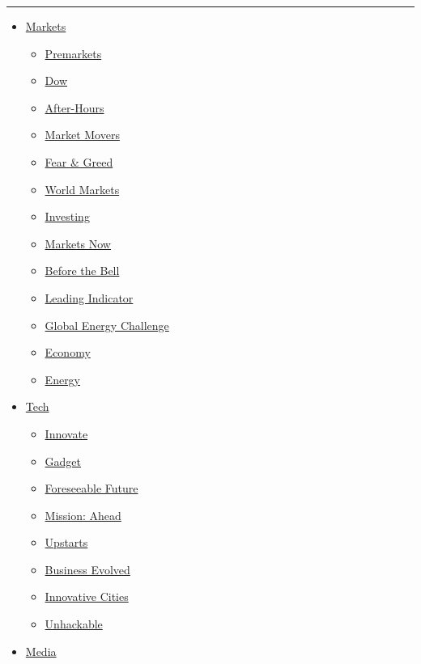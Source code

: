 \begin{center}\rule{0.5\linewidth}{\linethickness}\end{center}

\begin{itemize}
\tightlist
\item
  \href{https://money.cnn.com/data/markets/}{Markets}

  \begin{itemize}
  \tightlist
  \item
    \href{https://money.cnn.com/data/premarket/}{Premarkets}
  \item
    \href{https://money.cnn.com/data/markets/dow/}{Dow}
  \item
    \href{https://money.cnn.com/data/afterhours/}{After-Hours}
  \item
    \href{https://money.cnn.com/data/hotstocks/}{Market Movers}
  \item
    \href{https://money.cnn.com/data/fear-and-greed/}{Fear \& Greed}
  \item
    \href{https://money.cnn.com/data/world_markets/americas/}{World
    Markets}
  \item
    \href{/business/investing}{Investing}
  \item
    \href{https://money.cnn.com/investing/markets-now}{Markets Now}
  \item
    \href{/specials/investing/before-the-bell}{Before the Bell}
  \item
    \href{/specials/investing/leading-indicator}{Leading Indicator}
  \item
    \href{/specials/business/global-energy-challenge}{Global Energy
    Challenge}
  \item
    \href{/business/economy}{Economy}
  \item
    \href{/business/energy}{Energy}
  \end{itemize}
\item
  \href{/business/tech}{Tech}

  \begin{itemize}
  \tightlist
  \item
    \href{/specials/tech/innovate}{Innovate}
  \item
    \href{/specials/tech/gadget}{Gadget}
  \item
    \href{/specials/tech/foreseeable-future}{Foreseeable Future}
  \item
    \href{/specials/tech/mission-ahead}{Mission: Ahead}
  \item
    \href{/specials/tech/upstarts}{Upstarts}
  \item
    \href{/specials/tech/business-evolved}{Business Evolved}
  \item
    \href{/specials/tech/innovative-cities}{Innovative Cities}
  \item
    \href{/specials/tech/unhackable}{Unhackable}
  \end{itemize}
\item
  \href{/business/media}{Media}


\end{itemize}
